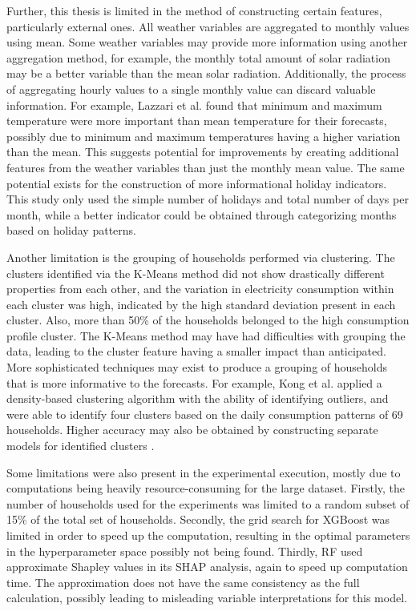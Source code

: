 
Further, this thesis is limited in the method of constructing certain features, particularly external ones. All weather variables are aggregated to monthly values using mean. Some weather variables may provide more information using another aggregation method, for example, the monthly total amount of solar radiation may be a better variable than the mean solar radiation. Additionally, the process of aggregating hourly values to a single monthly value can discard valuable information. For example, Lazzari et al. \cite{lazzari_user_2022} found that minimum and maximum temperature were more important than mean temperature for their forecasts, possibly due to minimum and maximum temperatures having a higher variation than the mean. This suggests potential for improvements by creating additional features from the weather variables than just the monthly mean value. The same potential exists for the construction of more informational holiday indicators. This study only used the simple number of holidays and total number of days per month, while a better indicator could be obtained through categorizing months based on holiday patterns.

Another limitation is the grouping of households performed via clustering. The clusters identified via the K-Means method did not show drastically different properties from each other, and the variation in electricity consumption within each cluster was high, indicated by the high standard deviation present in each cluster. Also, more than 50\% of the households belonged to the high consumption profile cluster. The K-Means method may have had difficulties with grouping the data, leading to the cluster feature having a smaller impact than anticipated. More sophisticated techniques may exist to produce a grouping of households that is more informative to the forecasts. For example, Kong et al. \cite{kong_short-term_2019} applied a density-based clustering algorithm with the ability of identifying outliers, and were able to identify four clusters based on the daily consumption patterns of 69 households. Higher accuracy may also be obtained by constructing separate models for identified clusters \cite{kiprijanovska_houseec_2020}.

Some limitations were also present in the experimental execution, mostly due to computations being heavily resource-consuming for the large dataset. Firstly, the number of households used for the experiments was limited to a random subset of 15\% of the total set of households. Secondly, the grid search for XGBoost was limited in order to speed up the computation, resulting in the optimal parameters in the hyperparameter space possibly not being found. Thirdly, RF used approximate Shapley values in its SHAP analysis, again to speed up computation time. The approximation does not have the same consistency as the full calculation, possibly leading to misleading variable interpretations for this model.


